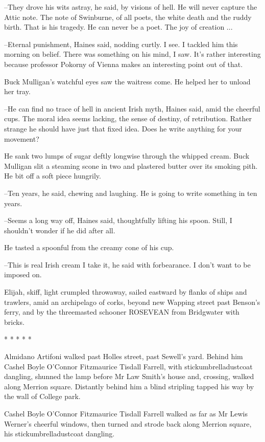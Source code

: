 --They drove his wits astray, he said, by visions of hell. He will never
capture the Attic note. The note of Swinburne, of all poets, the white
death and the ruddy birth. That is his tragedy. He can never be a poet.
The joy of creation ...

--Eternal punishment, Haines said, nodding curtly. I see. I tackled him
this morning on belief. There was something on his mind, I saw. It's
rather interesting because professor Pokorny of Vienna makes an
interesting point out of that.

Buck Mulligan's watchful eyes saw the waitress come.
He helped her to unload her tray.

--He can find no trace of hell in ancient Irish myth, Haines said, amid
the cheerful cups. The moral idea seems lacking, the sense of destiny, of
retribution. Rather strange he should have just that fixed idea. Does he
write anything for your movement?

He sank two lumps of sugar deftly longwise through the whipped
cream. Buck Mulligan slit a steaming scone in two and plastered butter
over its smoking pith. He bit off a soft piece hungrily.

--Ten years, he said, chewing and laughing.
He is going to write something in ten years.%

--Seems a long way off, Haines said, thoughtfully lifting his spoon.
Still, I shouldn't wonder if he did after all.

He tasted a spoonful from the creamy cone of his cup.

--This is real Irish cream I take it, he said with forbearance.
I don't want to be imposed on.

Elijah, skiff, light crumpled throwaway, sailed eastward by flanks of
ships and trawlers, amid an archipelago of corks, beyond new Wapping
street past Benson's ferry, and by the threemasted schooner ROSEVEAN from
Bridgwater with bricks.


    * * * * *


Almidano Artifoni walked past Holles street, past Sewell's yard.
Behind him Cashel Boyle O'Connor Fitzmaurice Tisdall Farrell, with
stickumbrelladustcoat dangling, shunned the lamp before Mr Law Smith's
house and, crossing, walked along Merrion square. Distantly behind him a
blind stripling tapped his way by the wall of College park.

Cashel Boyle O'Connor Fitzmaurice Tisdall Farrell walked as far as
Mr Lewis Werner's cheerful windows, then turned and strode back along
Merrion square, his stickumbrelladustcoat dangling.

